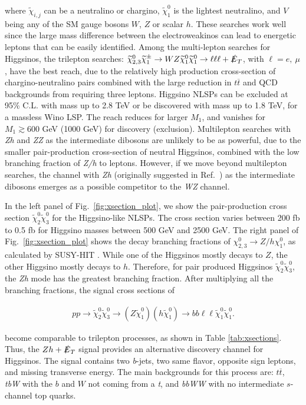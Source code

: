 \documentclass[a4paper,11pt]{article}
\newcommand{\N}{\widetilde{\chi}^0}
\newcommand{\C}{\widetilde{\chi}^\pm}
\newcommand{\met}{{\slashed{E}_T}}
\begin{document}
\noindent where $\widetilde{\chi}_{i,j}$ can be a neutralino or chargino, $\N_1$
is the lightest neutralino, and $V$ being any of the SM gauge bosons $W$, $Z$
or scalar $h$.  These searches work well since the large mass difference
between the electroweakinos can lead to energetic leptons that can be easily
identified. Among the multi-lepton searches for Higgsinos, the trilepton
searches: $\N_{2,3}\C_1\rightarrow WZ\N_1\N_1\rightarrow \ell\ell\ell +
\met$, with $\ell=e, \ \mu$,  have the best reach, due to the relatively high
production cross-section of chargino-neutralino pairs combined with the large
reduction in $t\overline{t}$ and QCD backgrounds from requiring three
leptons.  Higgsino NLSPs can be excluded at 95\% C.L. with mass up to 2.8 TeV
or be discovered with  mass up to 1.8 TeV, for a massless Wino LSP.   The reach
reduces for larger $M_1$, and vanishes for $M_1\gtrsim 600$ GeV (1000 GeV)
for discovery (exclusion).  Multilepton searches with \emph{Zh} and \emph{ZZ}
as the intermediate dibosons are unlikely to be as powerful, due to the smaller
pair-production cross-section of neutral Higgsinos, combined with the low
branching fraction of \emph{Z/h} to leptons. However, if we move beyond
multilepton searches, the channel with \emph{Zh} (originally suggested in
Ref.~\cite{Han:2013kza}) as the intermediate dibosons emerges as a possible
competitor to the \emph{WZ} channel.  


In the left panel of Fig.~\ref{fig:xsection_plot}, we show the pair-production
cross section $\N_2\N_3$ for the Higgsino-like NLSPs.  The cross section varies
between 200 fb to 0.5 fb for Higgsino masses between 500 GeV and 2500 GeV. The
right panel of Fig.~\ref{fig:xsection_plot} shows the decay branching fractions
of $\chi_{2,3}^0\rightarrow Z/h \chi_1^0$, as calculated by SUSY-HIT
\cite{Djouadi:2006bz}.  While one of the Higgsinos mostly decays to $Z$, the
other Higgsino mostly decays to $h$.    Therefore,  for pair produced Higgsinos
$\N_2\N_3$, the \emph{Zh} mode has the greatest branching fraction.  After
multiplying all the branching fractions, the signal cross sections of 

\begin{align}
  pp\rightarrow \N_2\N_3\rightarrow (Z\N_1)(h\N_1)\rightarrow bb\ell\ell \N_1\N_1.
\end{align}

\noindent become comparable  to trilepton processes, as shown in Table
\ref{tab:xsections}. Thus, the $Zh+\met$ signal provides an alternative discovery
channel for Higgsinos. The signal contains two \emph{b}-jets, two same flavor,
opposite sign leptons, and missing transverse energy. The main backgrounds for
this process are: $t\overline{t}$, \emph{tbW} with the $b$ and $W$ not coming
from a \emph{t}, and \emph{bbWW} with no intermediate $s$-channel top quarks.  
\end{document}
